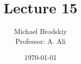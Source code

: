 


\title{Lecture 15}
\date{\today}
\author{Michael Brodskiy\\ \small Professor: A. Ali}



\maketitle

